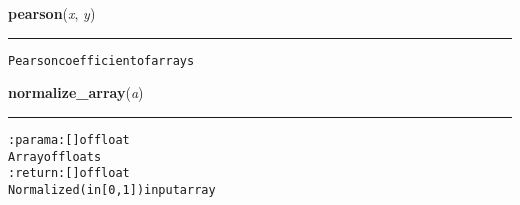 \hspace{.8\funcindent}\begin{boxedminipage}{\funcwidth}

    \raggedright \textbf{pearson}(\textit{x}, \textit{y})

    \vspace{-1.5ex}

    \rule{\textwidth}{0.5\fboxrule}
\setlength{\parskip}{2ex}
\begin{alltt}
Pearson coefficient of arrays
\end{alltt}

\setlength{\parskip}{1ex}
    \end{boxedminipage}

    \label{hal:ml:utils:misc:normalize_array}

    \vspace{0.5ex}

\hspace{.8\funcindent}\begin{boxedminipage}{\funcwidth}

    \raggedright \textbf{normalize\_array}(\textit{a})

    \vspace{-1.5ex}

    \rule{\textwidth}{0.5\fboxrule}
\setlength{\parskip}{2ex}
\begin{alltt}

:param a: [] of float
    Array of floats
:return: [] of float
    Normalized (in [0, 1]) input array
\end{alltt}

\setlength{\parskip}{1ex}
    \end{boxedminipage}

